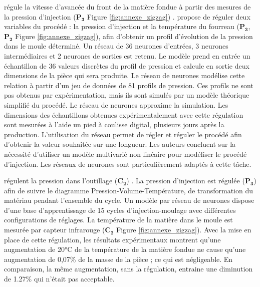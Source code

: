 \citeauthor{demirci_numerical_1997} régule la vitesse d'avancée du front de la matière fondue à partir des mesures de la pression d'injection ($\boldsymbol{P_3}$ Figure \ref{fig:annexe_zigzag}) \cite{demirci_numerical_1997}.
\citeauthor{woll_pattern-based_1997} \cite{woll_pattern-based_1997} propose de réguler deux variables du procédé : la pression d'injection et la température du fourreau ($\boldsymbol{P_3}$, $\boldsymbol{P_2}$ Figure \ref{fig:annexe_zigzag}), afin d'obtenir un profil d'évolution de la pression dans le moule déterminé.
Un réseau de 36 neurones d'entrées, 3 neurones intermédiaires et 2 neurones de sorties est retenu.
Le modèle prend en entrée un échantillon de 36 valeurs discrètes du profil de pression et calcule en sortie deux dimensions de la pièce qui sera produite.
Le réseau de neurones modélise cette relation à partir d'un jeu de données de 81 profils de pression.
Ces profils ne sont pas obtenus par expérimentation, mais ils sont simulés par un modèle théorique simplifié du procédé.
Le réseau de neurones approxime la simulation.
Les dimensions des échantillons obtenues expérimentalement avec cette régulation sont mesurées à l’aide un pied à coulisse digital, plusieurs jours après la production.  %
L’utilisation du réseau permet de régler et réguler le procédé afin d’obtenir la valeur souhaitée sur une longueur.
Les auteurs concluent sur la nécessité d’utiliser un modèle multivarié non linéaire pour modéliser le procédé d’injection.
Les réseaux de neurones sont particulièrement adaptés à cette tâche.

\citeauthor{michaeli_online_2009} régulent la pression dans l'outillage ($\boldsymbol{C_2}$) \cite{michaeli_online_2009}.  %
La pression d'injection est régulée ($\boldsymbol{P_3}$) afin de suivre le diagramme Pression-Volume-Température, de transformation du matériau pendant l'ensemble du cycle.
Un modèle par réseau de neurones dispose d'une base d'apprentissage de 15 cycles d’injection-moulage avec différentes configurations de réglages.
La température de la matière dans le moule est mesurée par capteur infrarouge ($\boldsymbol{C_2}$ Figure \ref{fig:annexe_zigzag}).
Avec la mise en place de cette régulation, les résultats expérimentaux  montrent qu’une augmentation de 20°C de la température de la matière fondue ne cause qu'une augmentation de 0,07\% de la masse de la pièce ; ce qui est négligeable.
En comparaison, la même augmentation, sans la régulation, entraine une diminution de 1.27\% qui n'était pas acceptable.



